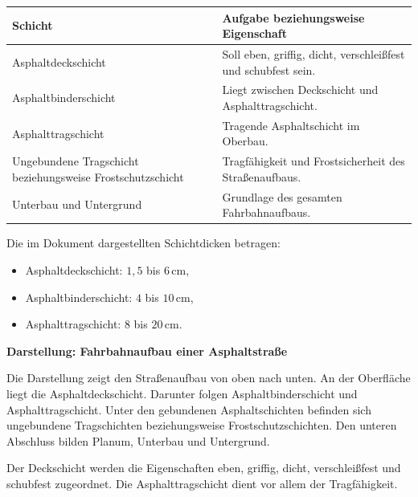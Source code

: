 \documentclass[
  12pt,
  a4paper,
  oneside
]{scrreprt}
\begin{document}
\begin{longtable}{
  >{\raggedright\arraybackslash}p{}
  >{\raggedright\arraybackslash}p{}
}
\toprule
\textbf{Schicht} &
\textbf{Aufgabe beziehungsweise Eigenschaft} \\
\midrule
\endhead

Asphaltdeckschicht &
Soll eben, griffig, dicht, verschleißfest und schubfest sein. \\

Asphaltbinderschicht &
Liegt zwischen Deckschicht und Asphalttragschicht. \\

Asphalttragschicht &
Tragende Asphaltschicht im Oberbau. \\

Ungebundene Tragschicht beziehungsweise Frostschutzschicht &
Tragfähigkeit und Frostsicherheit des Straßenaufbaus. \\

Unterbau und Untergrund &
Grundlage des gesamten Fahrbahnaufbaus. \\

\bottomrule
\end{longtable}



Die im Dokument dargestellten Schichtdicken betragen:

\begin{itemize}
  \item Asphaltdeckschicht: $1{,}5$ bis $6\,\mathrm{cm}$,
  \item Asphaltbinderschicht: $4$ bis $10\,\mathrm{cm}$,
  \item Asphalttragschicht: $8$ bis $20\,\mathrm{cm}$.
\end{itemize}



\begin{darstellungsbox}
\textbf{Darstellung: Fahrbahnaufbau einer Asphaltstraße}

Die Darstellung zeigt den Straßenaufbau von oben nach unten. An der
Oberfläche liegt die Asphaltdeckschicht. Darunter folgen
Asphaltbinderschicht und Asphalttragschicht. Unter den gebundenen
Asphaltschichten befinden sich ungebundene Tragschichten beziehungsweise
Frostschutzschichten. Den unteren Abschluss bilden Planum, Unterbau und
Untergrund.

Der Deckschicht werden die Eigenschaften eben, griffig, dicht,
verschleißfest und schubfest zugeordnet. Die Asphalttragschicht dient
vor allem der Tragfähigkeit.
\end{darstellungsbox}
\end{document}
